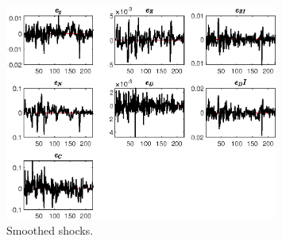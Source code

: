  
\begin{figure}[H]
\centering 
\includegraphics[width=0.80\textwidth]{BRS_growth_KPR/graphs/BRS_growth_KPR_SmoothedShocks1}
\caption{Smoothed shocks.}\label{Fig:SmoothedShocks:1}
\end{figure}


